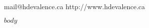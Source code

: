 \documentclass[letterpaper,10pt]{article}
\begin{document}
\pagestyle{empty}

 \\
mail@hdevalence.ca \quad http:/\kern-1.7pt/www.hdevalence.ca

$body$
\end{document}
